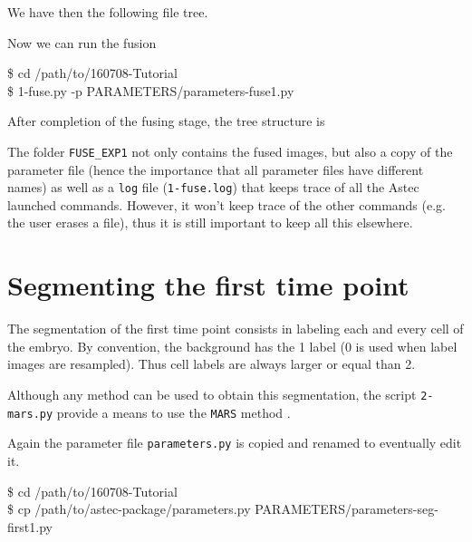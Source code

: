 We have then the following file tree.


Now we can run the fusion

\begin{code}{0.8}
\$ cd /path/to/160708-Tutorial\\
\$ 1-fuse.py -p PARAMETERS/parameters-fuse1.py 
\end{code}

After completion of the fusing stage, the tree structure is 

The folder \texttt{FUSE\_EXP1} not only contains the fused images, but also a copy of the parameter file (hence the importance that all parameter files have different names) as well as a \texttt{log} file (\texttt{1-fuse.log}) that keeps trace of all the Astec launched commands. However, it won't keep trace of the other commands (e.g. the user erases a file), thus it is still important to keep all this elsewhere.










\section{Segmenting the first time point}

The segmentation of the first time point consists in labeling each and every cell of the embryo. By convention, the background has the 1 label (0 is used when label images are resampled). Thus cell labels are always larger or equal than 2.

Although any method can be used to obtain this segmentation, the script \texttt{2-mars.py} provide a means to use the \texttt{MARS} method \cite{fernandez:hal-00521491}.

Again the parameter file \texttt{parameters.py} is copied  and renamed to eventually edit it. 


\begin{code}{0.8}
\$ cd /path/to/160708-Tutorial\\
\$ cp /path/to/astec-package/parameters.py  PARAMETERS/parameters-seg-first1.py
\end{code}



